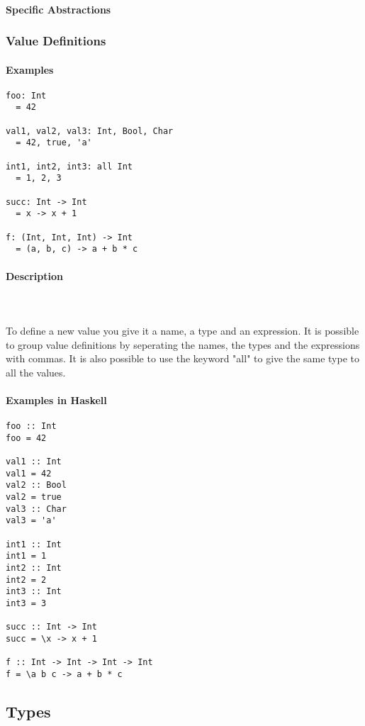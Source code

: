 \documentclass{article}
\def\H{Haskell}
\begin{document}
\paragraph{Specific Abstractions}

\subsubsection{Value Definitions}

\paragraph{Examples}

\begin{verbatim}
foo: Int
  = 42

val1, val2, val3: Int, Bool, Char
  = 42, true, 'a'

int1, int2, int3: all Int
  = 1, 2, 3

succ: Int -> Int
  = x -> x + 1

f: (Int, Int, Int) -> Int
  = (a, b, c) -> a + b * c
\end{verbatim}

\paragraph{Description}\mbox{} \\\\
To define a new value you give it a name, a type and an expression. It is possible
to group value definitions by seperating the names, the types and the expressions
with commas. It is also possible to use the keyword "all" to give the same type
to all the values.

\paragraph{Examples in \H}

\begin{verbatim}
foo :: Int
foo = 42

val1 :: Int
val1 = 42
val2 :: Bool
val2 = true
val3 :: Char
val3 = 'a'

int1 :: Int
int1 = 1
int2 :: Int
int2 = 2
int3 :: Int
int3 = 3

succ :: Int -> Int
succ = \x -> x + 1

f :: Int -> Int -> Int -> Int
f = \a b c -> a + b * c
\end{verbatim}

\subsection{Types}
\end{document}
